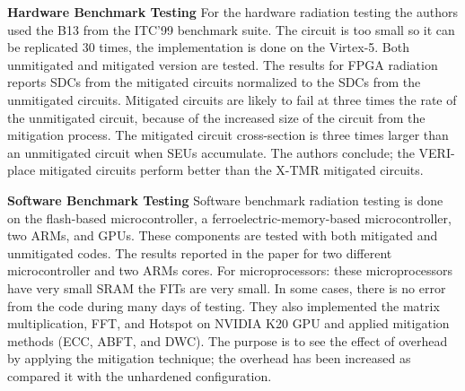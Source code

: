 \textbf{Hardware Benchmark Testing}
For the hardware radiation testing the authors used the B13 from the ITC’99 benchmark suite. The circuit is too small so it can be replicated 30 times, the implementation is done on the Virtex-5. Both unmitigated and mitigated version are tested. The results for FPGA radiation reports SDCs from the mitigated circuits normalized to the SDCs from the unmitigated circuits. Mitigated circuits are likely to fail at three times the rate of the unmitigated circuit, because of the increased size of the circuit from the mitigation process. The mitigated circuit cross-section is three times larger than an unmitigated circuit when SEUs accumulate. The authors conclude; the VERI-place mitigated circuits perform better than the X-TMR mitigated circuits.

\textbf{Software Benchmark Testing}
Software benchmark radiation testing is done on the flash-based microcontroller,  a ferroelectric-memory-based microcontroller, two ARMs, and GPUs. These components are tested with both mitigated and unmitigated codes. The results reported in the paper for two different microcontroller and two ARMs cores. For microprocessors: these microprocessors have very small SRAM the FITs are very small. In some cases, there is no error from the code during many days of testing. They also implemented the matrix multiplication, FFT, and Hotspot on NVIDIA K20 GPU and applied mitigation methods (ECC, ABFT, and DWC).  The purpose is to see the effect of overhead by applying the mitigation technique; the overhead has been increased as compared it with the unhardened configuration.










